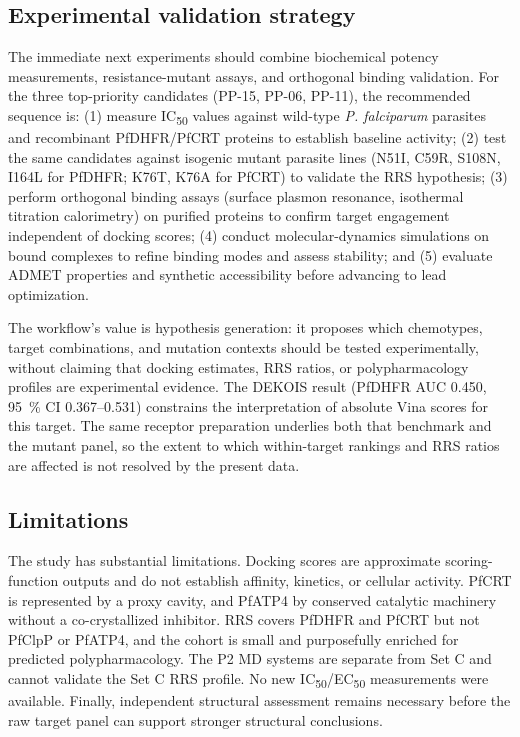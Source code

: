 \documentclass[journal=jcisd8,manuscript=article]{achemso}
\begin{document}
\subsection{Experimental validation strategy}
The immediate next experiments should combine biochemical potency measurements, resistance-mutant assays, and orthogonal binding validation. For the three top-priority candidates (PP-15, PP-06, PP-11), the recommended sequence is: (1) measure IC\textsubscript{50} values against wild-type \emph{P. falciparum} parasites and recombinant PfDHFR/PfCRT proteins to establish baseline activity; (2) test the same candidates against isogenic mutant parasite lines (N51I, C59R, S108N, I164L for PfDHFR; K76T, K76A for PfCRT) to validate the RRS hypothesis; (3) perform orthogonal binding assays (surface plasmon resonance, isothermal titration calorimetry) on purified proteins to confirm target engagement independent of docking scores; (4) conduct molecular-dynamics simulations on bound complexes to refine binding modes and assess stability; and (5) evaluate ADMET properties and synthetic accessibility before advancing to lead optimization.

The workflow's value is hypothesis generation: it proposes which chemotypes, target combinations, and mutation contexts should be tested experimentally, without claiming that docking estimates, RRS ratios, or polypharmacology profiles are experimental evidence. The DEKOIS result (PfDHFR AUC \num{0.450}, \qty{95}{\percent} CI \numrange{0.367}{0.531}) constrains the interpretation of absolute Vina scores for this target. The same receptor preparation underlies both that benchmark and the mutant panel, so the extent to which within-target rankings and RRS ratios are affected is not resolved by the present data.

\subsection{Limitations}

The study has substantial limitations. Docking scores are approximate scoring-function outputs and do not establish affinity, kinetics, or cellular activity. PfCRT is represented by a proxy cavity, and PfATP4 by conserved catalytic machinery without a co-crystallized inhibitor. RRS covers PfDHFR and PfCRT but not PfClpP or PfATP4, and the cohort is small and purposefully enriched for predicted polypharmacology. The P2 MD systems are separate from Set C and cannot validate the Set C RRS profile. No new IC\textsubscript{50}/EC\textsubscript{50} measurements were available. Finally, independent structural assessment remains necessary before the raw target panel can support stronger structural conclusions.
\end{document}
